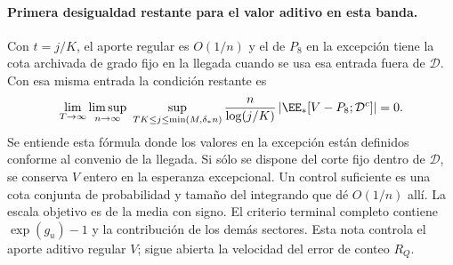 \paragraph{Primera desigualdad restante para el valor aditivo en esta banda.}
Con $t=j/K$, el aporte regular es $O(1/n)$ y el de $P_8$ en la excepción tiene
la cota archivada de grado fijo en la llegada cuando se usa esa entrada fuera de
$\mathcal D$. Con esa misma entrada la condición restante es
\[
 \lim_{T\to\infty}\limsup_{n\to\infty}\
 \sup_{TK\le j\le\min(M,\delta_*n)}
 \frac n{\log(j/K)}
 \left|\EE_*[V-P_8;\mathcal D^c]\right|=0 .
\]
Se entiende esta fórmula donde los valores en la excepción están definidos conforme
al convenio de la llegada. Si sólo se dispone del corte fijo dentro de $\mathcal D$,
se conserva $V$ entero en la esperanza excepcional. Un control suficiente es una
cota conjunta de probabilidad y tamaño del integrando que dé $O(1/n)$ allí.
La escala objetivo es de la media con signo. El criterio terminal completo contiene
$\exp(g_u)-1$ y la contribución de los demás sectores. Esta nota controla el aporte
aditivo regular $V$; sigue abierta la velocidad del error de conteo $R_Q$.

